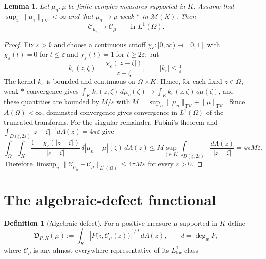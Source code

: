 \documentclass[reqno]{amsart}
\newtheorem{lemma}[theorem]{Lemma}
\theoremstyle{definition}
\newtheorem{definition}[theorem]{Definition}
\theoremstyle{remark}
\newcommand{\M}{\mathcal M}
\newcommand{\Cauchy}{\mathcal C}
\newcommand{\TV}{\mathrm{TV}}
\newcommand{\eps}{\varepsilon}
\begin{document}
\begin{lemma}\label{lem:L1-Cauchy-continuity}
Let $\mu_n,\mu$ be finite complex measures supported in $K$.  Assume that
$\sup_n\|\mu_n\|_{\TV}<\infty$ and that $\mu_n\to\mu$ weak-$*$ in $\M(K)$.
Then
\begin{equation}\label{eq:L1-Cauchy-convergence}
 \Cauchy_{\mu_n}\longrightarrow\Cauchy_\mu
 \qquad\text{in }L^1(\Omega).
\end{equation}
\end{lemma}

\begin{proof}
Fix $\eps>0$ and choose a continuous cutoff $\chi_\eps:[0,\infty)\to[0,1]$ with
$\chi_\eps(t)=0$ for $t\leq\eps$ and $\chi_\eps(t)=1$ for $t\geq 2\eps$; put
\[
 k_\eps(z,\zeta)=\frac{\chi_\eps(|z-\zeta|)}{z-\zeta},
 \qquad |k_\eps|\leq\tfrac1\eps .
\]
The kernel $k_\eps$ is bounded and continuous on $\overline\Omega\times K$.
Hence, for each fixed $z\in\Omega$, weak-$*$ convergence gives
$\int_Kk_\eps(z,\zeta)\,d\mu_n(\zeta)\to\int_Kk_\eps(z,\zeta)\,d\mu(\zeta)$, and
these quantities are bounded by $M/\eps$ with
$M=\sup_n\|\mu_n\|_{\TV}+\|\mu\|_{\TV}$.  Since $A(\Omega)<\infty$, dominated
convergence gives convergence in $L^1(\Omega)$ of the truncated transforms.  For
the singular remainder, Fubini's theorem and
$\int_{D(\zeta,2\eps)}|z-\zeta|^{-1}dA(z)=4\pi\eps$ give
\[
 \int_\Omega\int_K
 \frac{1-\chi_\eps(|z-\zeta|)}{|z-\zeta|}\,
 d|\mu_n-\mu|(\zeta)\,dA(z)
 \leq
 M\sup_{\zeta\in K}\int_{D(\zeta,2\eps)}\frac{dA(z)}{|z-\zeta|}
 =4\pi M\eps .
\]
Therefore
$\limsup_n\|\Cauchy_{\mu_n}-\Cauchy_\mu\|_{L^1(\Omega)}\leq 4\pi M\eps$ for
every $\eps>0$.
\end{proof}

\section{The algebraic-defect functional}\label{sec:defect}

\begin{definition}[Algebraic defect]
\label{def:algebraic-defect}
For a positive measure $\mu$ supported in $K$ define
\begin{equation}\label{eq:defect-functional}
 \mathfrak D_{P,K}(\mu)
 :=\int_K
 \left|P\bigl(z,\Cauchy_\mu(z)\bigr)\right|^{1/d}\,dA(z),
 \qquad d=\deg_wP,
\end{equation}
where $\Cauchy_\mu$ is any almost-everywhere representative of its
$L^1_{\mathrm{loc}}$ class.
\end{definition}
\end{document}
